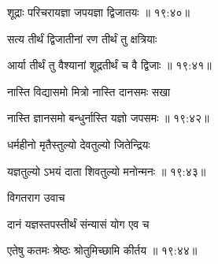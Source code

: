 
{\devanagarifont शूद्राः परिचरायज्ञा जपयज्ञा द्विजातयः {॥ १९:४०॥} \veg\dontdisplaylinenum }%

{\devanagarifont सत्य तीर्थं द्विजातीनां रण तीर्थं तु क्षत्रियाः \thinspace{\dandab} \dontdisplaylinenum }%


{\devanagarifont आर्या तीर्थं तु वैश्यानां शूद्रतीर्थं च वै द्विजाः {॥ १९:४१॥} \veg\dontdisplaylinenum }%

{\devanagarifont नास्ति विद्यासमो मित्रो नास्ति दानसमः सखा \thinspace{\dandab} \dontdisplaylinenum }%
 

{\devanagarifont नास्ति ज्ञानसमो बन्धुर्नास्ति यज्ञो जपसमः {॥ १९:४२॥} \veg\dontdisplaylinenum }%

{\devanagarifont धर्महीनो मृतैस्तुल्यो देवतुल्यो जितेन्द्रियः \thinspace{\dandab} \dontdisplaylinenum }%


{\devanagarifont यज्ञतुल्यो ऽभयं दाता शिवतुल्यो मनोन्मनः {॥ १९:४३॥} \veg\dontdisplaylinenum }%
 
{\devanagarifont विगतराग उवाच {\dandab}\dontdisplaylinenum  }%
 
{\devanagarifont दानं यज्ञस्तपस्तीर्थं संन्यासं योग एव च \thinspace{\danda} \dontdisplaylinenum }%


{\devanagarifont एतेषु कतमः श्रेष्ठः श्रोतुमिच्छामि कीर्तय {॥ १९:४४॥} \veg\dontdisplaylinenum }%
 
